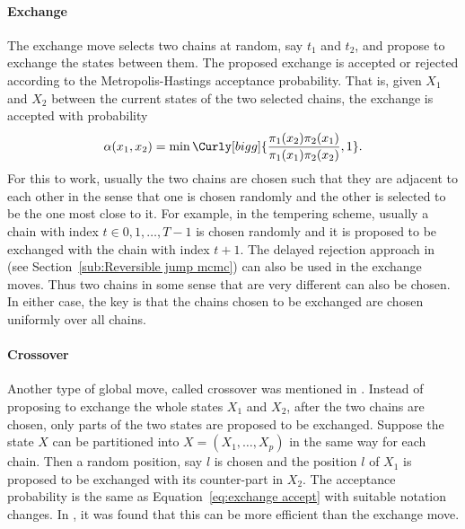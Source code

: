 

\paragraph{Exchange}

The exchange move selects two chains at random, say $t_1$ and $t_2$, and
propose to exchange the states between them. The proposed exchange is accepted
or rejected according to the Metropolis-Hastings acceptance probability. That
is, given $X_1$ and $X_2$ between the current states of the two selected
chains, the exchange is accepted with probability
\begin{equation}
  \alpha(x_1, x_2) =
  \min\Curly[bigg]{\frac{\pi_1(x_2)\pi_2(x_1)}{\pi_1(x_1)\pi_2(x_2)}, 1}.
  \label{eq:exchange accept}
\end{equation}
For this to work, usually the two chains are chosen such that they are
adjacent to each other in the sense that one is chosen randomly and the other
is selected to be the one most close to it. For example, in the tempering
scheme, usually a chain with index $t\in{0,1,\dots,T-1}$ is chosen randomly
and it is proposed to be exchanged with the chain with index $t+1$. The
delayed rejection approach in \cite{Green:2001tk} (see
Section~\ref{sub:Reversible jump mcmc}) can also be used in the exchange
moves. Thus two chains in some sense that are very different can also be
chosen. In either case, the key is that the chains chosen to be exchanged are
chosen uniformly over all chains.

\paragraph{Crossover}

Another type of global move, called crossover was mentioned in
\cite{Liang:2001dc}. Instead of proposing to exchange the whole states $X_1$
and $X_2$, after the two chains are chosen, only parts of the two states are
proposed to be exchanged. Suppose the state $X$ can be partitioned into $X =
(X_1,\dots,X_p)$ in the same way for each chain. Then a random position, say
$l$ is chosen and the position $l$ of $X_1$ is proposed to be exchanged with
its counter-part in $X_2$. The acceptance probability is the same as
Equation~\eqref{eq:exchange accept} with suitable notation changes. In
\cite{Jasra:2007in}, it was found that this can be more efficient than the
exchange move.

